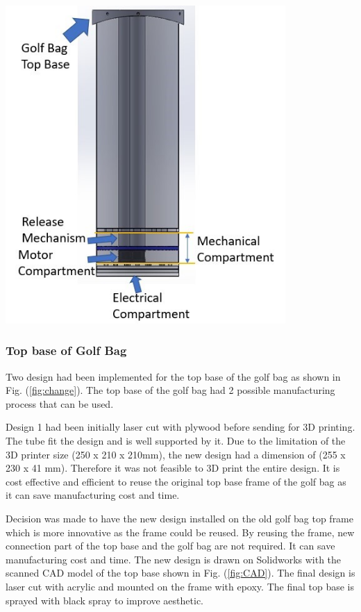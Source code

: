 \documentclass[11pt,landscape]{article}
\newenvironment{Figure}
  {\par\medskip\noindent\minipage{\linewidth}}
  {\endminipage\par\medskip}
\begin{document}
\begin{multicols}{3}
    
    
    \begin{Figure}
        \begin{center}
            \includegraphics[width=0.8\textwidth]{Figure16.jpg}
            \label{fig:golfbag}
        \end{center}
    \end{Figure}
    
    
    
    \subsubsection{Top base of Golf Bag}
    Two design had been implemented for the top base of the golf bag as shown in Fig. (\ref{fig:change}). The top base of the golf bag had 2 possible manufacturing process that can be used.
      
Design 1 had been initially laser cut with plywood before sending
    for 3D printing. The tube fit the design and is well supported by it.
    Due to the limitation of the 3D printer size (250 x 210 x 210mm), the new
    design had a dimension of (255 x 230 x 41 mm). Therefore it was not feasible
to 3D print the entire design.
It is cost effective and efficient to reuse the original top base frame of the golf bag as it can save manufacturing cost and time. 
    
    Decision was made to have the new design installed on the old golf bag 
    top frame which is more innovative as the frame could be reused. By reusing the frame, new connection part of the top base and the golf bag are not required. It can save manufacturing cost and time. The new
    design is drawn on Solidworks with the scanned CAD model of the top base shown in 
     Fig. (\ref{fig:CAD}). The final design is laser cut with acrylic and
    mounted on the frame with epoxy. The final top base is sprayed with black
    spray to improve aesthetic.


\end{multicols}
\end{document}
